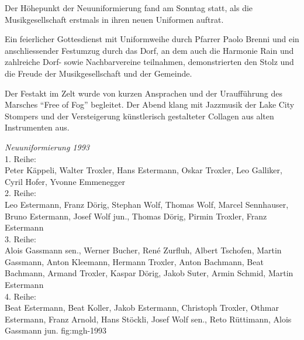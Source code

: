 \begin{history}

    Der Höhepunkt der Neuuniformierung fand am Sonntag statt, als die
    Musikgesellschaft erstmals in ihren neuen Uniformen auftrat.


    Ein feierlicher Gottesdienst mit Uniformweihe durch Pfarrer Paolo Brenni und
    ein anschliessender Festumzug durch das Dorf, an dem auch die Harmonie Rain
    und zahlreiche Dorf- sowie Nachbarvereine teilnahmen, demonstrierten den
    Stolz und die Freude der Musikgesellschaft und der Gemeinde.


    Der Festakt im Zelt wurde von kurzen Ansprachen und der Uraufführung des
    Marsches \enquote{Free of Fog} begleitet. Der Abend klang mit Jazzmusik der
    Lake City Stompers und der Versteigerung künstlerisch gestalteter Collagen
    aus alten Instrumenten aus.


\end{history}


{\emph{Neuuniformierung 1993}\\
    1. Reihe:\\
    Peter Käppeli, Walter Troxler, Hans Estermann, Oskar Troxler, Leo Galliker,
    Cyril Hofer, Yvonne Emmenegger\\
    2. Reihe:\\
    Leo Estermann, Franz Dörig, Stephan Wolf, Thomas Wolf, Marcel Sennhauser,
    Bruno Estermann, Josef Wolf jun., Thomas Dörig, Pirmin Troxler, Franz
    Estermann\\
    3. Reihe:\\
    Alois Gassmann sen., Werner Bucher, René Zurfluh, Albert Tschofen, Martin
    Gassmann, Anton Kleemann, Hermann Troxler, Anton Bachmann, Beat Bachmann,
    Armand Troxler, Kaspar Dörig, Jakob Suter, Armin Schmid, Martin Estermann\\
    4. Reihe:\\
    Beat Estermann, Beat Koller, Jakob Estermann, Christoph Troxler, Othmar
    Estermann, Franz Arnold, Hans Stöckli, Josef Wolf sen., Reto Rüttimann,
    Alois Gassmann jun. } {fig:mgh-1993}


